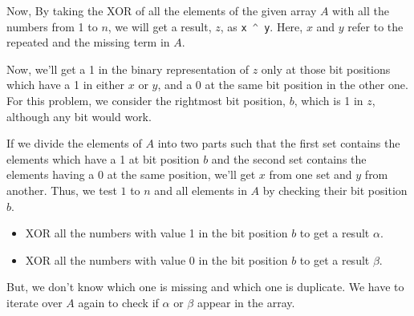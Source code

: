 Now, By taking the XOR of all the elements of the given array $A$ with all the numbers from 1 to $n$, we will get a result, $z$, as \lstinline[language=Java, basicstyle=\small\ttfamily, keywordstyle=\bfseries\color{green!40!black}]|x ^ y|. Here, $x$ and $y$ refer to the repeated and the missing term in $A$.

Now, we'll get a 1 in the binary representation of $z$ only at those bit positions which have a 1 in either $x$ or $y$, and a 0 at the same bit position in the other one. For this problem, we consider the rightmost bit position, $b$, which is 1 in $z$, although any bit would work.

If we divide the elements of $A$ into two parts such that the first set contains the elements which have a 1 at bit position $b$ and the second set contains the elements having a 0 at the same position, we'll get $x$ from one set and $y$ from another. Thus, we test $1$ to $n$ and all elements in $A$ by checking their bit position $b$.

\begin{itemize}
\item XOR all the numbers with value 1 in the bit position $b$ to get a result $\alpha$.
\item XOR all the numbers with value 0 in the bit position $b$ to get a result $\beta$.
\end{itemize}

But, we don't know which one is missing and which one is duplicate. We have to iterate over $A$ again to check if $\alpha$ or $\beta$ appear in the array.
